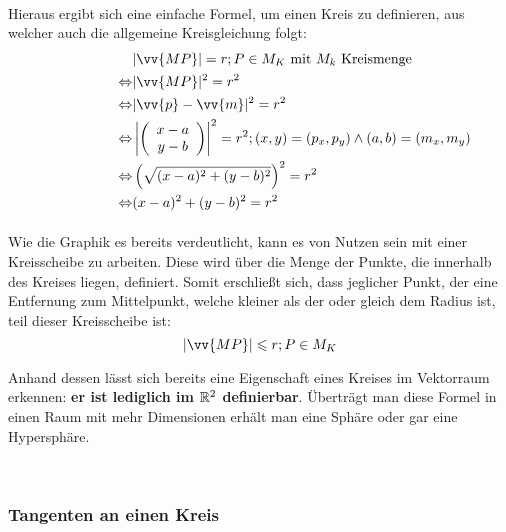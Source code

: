 \documentclass[main.tex]{subfiles}
\begin{document}
        \paragraph{} Hieraus ergibt sich eine einfache Formel, um einen Kreis zu definieren, aus welcher auch die allgemeine Kreisgleichung folgt:
        \\
        \begin{align*}
            \qquad \qquad \qquad &|\vv{MP}| = r ; P \in M_K \text{ mit $M_k$ Kreismenge} \\
                 \Leftrightarrow &|\vv{MP}|^2 = r^2 \\
                 \Leftrightarrow &|\vv{p} - \vv{m}|^2 = r^2 \\
                 \Leftrightarrow &\left|\left(\begin{array}{c} x - a \\ y - b\end{array}\right)\right|^2 = r^2 ; (x,y) = (p_x,p_y) \land (a,b) = (m_x,m_y) \\
                 \Leftrightarrow &\left(\sqrt{(x - a)^2 + (y - b)^2}\right)^2 = r^2 \\
                 \Leftrightarrow &(x - a)^2 + (y - b)^2 = r^2 \\
        \end{align*}
        \paragraph{} Wie die Graphik es bereits verdeutlicht, kann es von Nutzen sein mit einer Kreisscheibe zu arbeiten. Diese wird über die Menge der Punkte, die innerhalb des Kreises liegen, definiert.
        Somit erschließt sich, dass jeglicher Punkt, der eine Entfernung zum Mittelpunkt, welche kleiner als der oder gleich dem Radius ist, teil dieser Kreisscheibe ist:
                                                    $$|\vv{MP}| \leq r ; P \in M_K$$

        \begin{Bemerkung}
            Anhand dessen lässt sich bereits eine Eigenschaft eines Kreises im Vektorraum erkennen: \textbf{er ist lediglich im $\mathbb{R}^2$ definierbar}. Überträgt man diese Formel in einen Raum mit mehr Dimensionen erhält man eine Sphäre oder gar eine Hypersphäre.
        \end{Bemerkung}

        \\
        \subsubsection{Tangenten an einen Kreis}
\end{document}
